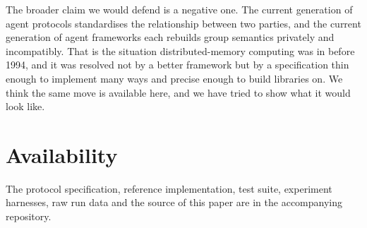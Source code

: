 The broader claim we would defend is a negative one. The current generation
of agent protocols standardises the relationship between two parties, and
the current generation of agent frameworks each rebuilds group semantics
privately and incompatibly. That is the situation distributed-memory
computing was in before 1994, and it was resolved not by a better framework
but by a specification thin enough to implement many ways and precise enough
to build libraries on. We think the same move is available here, and we have
tried to show what it would look like.

\section*{Availability}

The protocol specification, reference implementation, test suite,
experiment harnesses, raw run data and the source of this paper are in the
accompanying repository.
